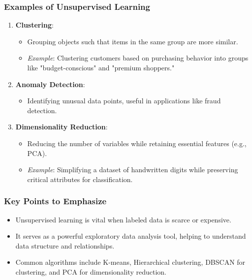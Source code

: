 \documentclass[aspectratio=169]{beamer}
\begin{document}
\begin{frame}[fragile]
  \frametitle{Examples of Unsupervised Learning}
  \begin{enumerate}
    \item \textbf{Clustering}:
      \begin{itemize}
        \item Grouping objects such that items in the same group are more similar.
        \item \textit{Example}: Clustering customers based on purchasing behavior into groups like "budget-conscious" and "premium shoppers."
      \end{itemize}
      
    \item \textbf{Anomaly Detection}:
      \begin{itemize}
        \item Identifying unusual data points, useful in applications like fraud detection.
      \end{itemize}
      
    \item \textbf{Dimensionality Reduction}:
      \begin{itemize}
        \item Reducing the number of variables while retaining essential features (e.g., PCA).
        \item \textit{Example}: Simplifying a dataset of handwritten digits while preserving critical attributes for classification.
      \end{itemize}
  \end{enumerate}
\end{frame}

\begin{frame}[fragile]
  \frametitle{Key Points to Emphasize}
  \begin{itemize}
    \item Unsupervised learning is vital when labeled data is scarce or expensive.
    \item It serves as a powerful exploratory data analysis tool, helping to understand data structure and relationships.
    \item Common algorithms include K-means, Hierarchical clustering, DBSCAN for clustering, and PCA for dimensionality reduction.
  \end{itemize}
\end{frame}
\end{document}

